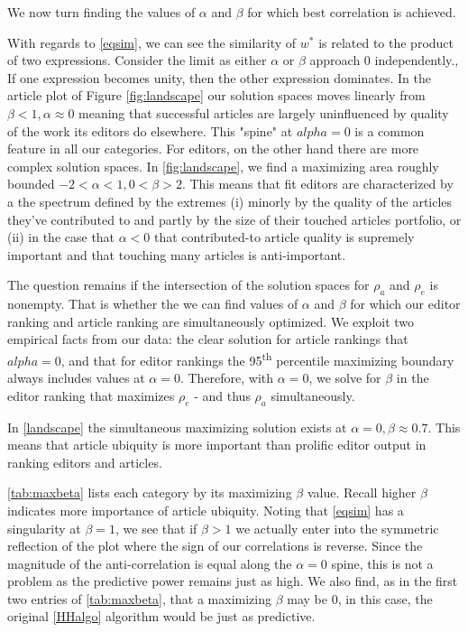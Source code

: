 We now turn finding the values of $\alpha$ and $\beta$ for which best correlation is achieved.  

With regards to \eqref{eqsim}, we can see the similarity of $w^*$ is related to the product of two expressions. Consider the limit as either $\alpha$ or $\beta$ approach $0$ independently., If one expression becomes unity, then the other expression dominates. In the article plot of Figure \ref{fig:landscape} our solution spaces moves linearly from $ \beta < 1 , \alpha \approx 0$ meaning that successful articles are largely uninfluenced by quality of the work its editors do elsewhere. This "spine" at $alpha = 0$ is a common feature in all our categories.
For editors, on the other hand there are more complex solution spaces. In  \ref{fig:landscape}, we find a maximizing area roughly bounded $ -2  <\alpha < 1 , 0 < \beta > 2 $. This means that fit editors are characterized by a the spectrum defined by the extremes (i) minorly by the quality of the articles they've contributed to and partly by the size of their touched articles portfolio, or (ii) in the case that $\alpha < 0$ that contributed-to article quality is supremely important and that touching many articles is anti-important.

The question remains if the intersection of the solution spaces for $\rho_a$ and $\rho_e$ is nonempty. That is whether the we can find values of $\alpha$ and $\beta$ for which our editor ranking and article ranking are simultaneously optimized. We exploit two empirical facts from our data: the clear solution for article rankings that $alpha = 0$, and that for editor rankings the 95\textsuperscript{th} percentile maximizing boundary always includes values at $\alpha = 0$. Therefore, with $\alpha = 0$, we solve for $\beta$ in the editor ranking that maximizes $\rho_e$ - and thus $\rho_a$ simultaneously. 

In \ref{landscape} the simultaneous maximizing solution exists at $\alpha = 0, \beta \approx 0.7$. This means that article ubiquity is more important than prolific editor output in ranking editors and articles.

\ref{tab:maxbeta} lists each category by its maximizing $\beta$ value. Recall higher $\beta$ indicates more importance of article ubiquity. Noting that \eqref{eqsim} has a singularity at $\beta = 1$, we see that if $\beta > 1$ we actually enter into the symmetric reflection of the plot where the sign of our correlations is reverse. Since the magnitude of the anti-correlation is equal along the $\alpha = 0$ spine, this is not a problem as the predictive power remains just as high.
We also find, as in the first two entries of \ref{tab:maxbeta}, that a maximizing $\beta$ may be $0$, in this case, the original \ref{HHalgo} algorithm would be just as predictive. 

